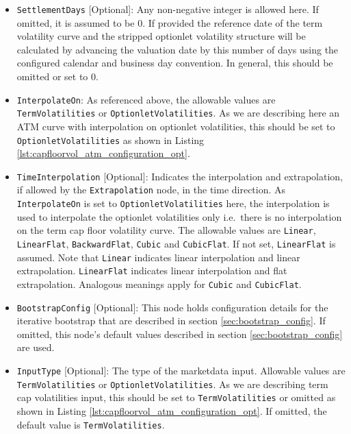 \begin{itemize}
\item \lstinline!SettlementDays! [Optional]:
Any non-negative integer is allowed here. If omitted, it is assumed to be 0. If provided the reference date of the term volatility curve and the stripped optionlet volatility structure will be calculated by advancing the valuation date by this number of days using the configured calendar and business day convention. In general, this should be omitted or set to 0.

\item \lstinline!InterpolateOn!:
As referenced above, the allowable values are \lstinline!TermVolatilities! or \lstinline!OptionletVolatilities!. As we are describing here an ATM curve with interpolation on optionlet volatilities, this should be set to \lstinline!OptionletVolatilities! as shown in Listing \ref{lst:capfloorvol_atm_configuration_opt}.

\item \lstinline!TimeInterpolation! [Optional]:
Indicates the interpolation and extrapolation, if allowed by the \lstinline!Extrapolation! node, in the time direction. As \lstinline!InterpolateOn! is set to \lstinline!OptionletVolatilities! here, the interpolation is used to interpolate the optionlet volatilities only i.e.\ there is no interpolation on the term cap floor volatility curve. The allowable values are \lstinline!Linear!, \lstinline!LinearFlat!, \lstinline!BackwardFlat!, \lstinline!Cubic! and \lstinline!CubicFlat!. If not set, \lstinline!LinearFlat! is assumed. Note that \lstinline!Linear! indicates linear interpolation and linear extrapolation. \lstinline!LinearFlat! indicates linear interpolation and flat extrapolation. Analogous meanings apply for \lstinline!Cubic! and \lstinline!CubicFlat!.

\item \lstinline!BootstrapConfig! [Optional]:
This node holds configuration details for the iterative bootstrap that are described in section \ref{sec:bootstrap_config}. If omitted, this node's default values described in section \ref{sec:bootstrap_config} are used.

\item \lstinline!InputType! [Optional]:
The type of the marketdata input. Allowable values are \lstinline!TermVolatilities! or \lstinline!OptionletVolatilities!. As we are describing term cap volatilities input, this should be set to \lstinline!TermVolatilities! or omitted as shown in Listing \ref{lst:capfloorvol_atm_configuration_opt}. If omitted, the default value is \lstinline!TermVolatilities!.


\end{itemize}
